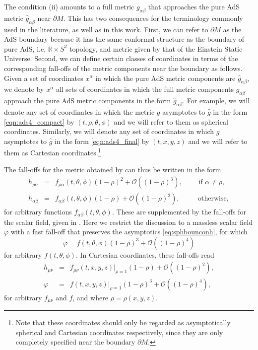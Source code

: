 \documentclass[a4paper,11pt]{article}
\numberwithin{equation}{section}
\begin{document}
The condition (ii) amounts to a full metric $g_{\alpha\beta}$ that approaches the pure AdS metric $\hat{g}_{\alpha\beta}$ near $\partial M$.
This has two consequences for the terminology commonly used in the literature, as well as in this work.
First, we can refer to $\partial M$ as the AdS boundary because it has the same conformal structure as the boundary of pure AdS, i.e, $\mathbb{R}\times S^2$ topology, and metric given by that of the Einstein Static Universe. 
Second, we can define certain classes of coordinates in terms of the corresponding fall-offs of the metric components near the boundary as follows.
Given a set of coordinates $x^\alpha$ in which the pure AdS metric components are $\hat{g}_{\alpha\beta}$, we denote by $x^\alpha$ all sets of coordinates in which the full metric components $g_{\alpha\beta}$ approach the pure AdS metric components in the form $\hat{g}_{\alpha\beta}$. For example, we will denote any set of coordinates in which the metric $g$ asymptotes to $\hat{g}$ in the form \eqref{eqn:ads4_compact} by $(t,\rho,\theta,\phi)$ and we will refer to them as spherical coordinates. Similarly, we will denote any set of coordinates in which $g$ asymptotes to $\hat{g}$ in the form \eqref{eqn:ads4_final} by $(t,x,y,z)$ and we will refer to them as Cartesian coordinates.\footnote{Note that these coordinates should only be regarded as asymptotically spherical and Cartesian coordinates respectively, since they are only completely specified near the boundary $\partial M$.}

The fall-offs for the metric obtained by \cite{Henneaux:1985tv} can thus be written in the form
\begin{eqnarray}
\label{eq:sphbounconh}
h_{\rho\alpha}&=&f_{\rho\alpha}(t,\theta,\phi)(1-\rho)^2+\mathcal{O}((1-\rho)^3), \qquad \textrm{ if $\alpha\neq\rho$}, \\ \nonumber
h_{\alpha\beta}&=&f_{\alpha\beta}(t,\theta,\phi)(1-\rho)+\mathcal{O}((1-\rho)^{2}), \qquad\; \textrm{ otherwise},
\end{eqnarray}
for arbitrary functions $f_{\alpha\beta}(t,\theta,\phi)$. 
These are supplemented by the fall-offs for the scalar field, given in \cite{Henneaux:2006hk}.
Here we restrict the discussion to a massless scalar field $\varphi$ with a fast fall-off that preserves the asymptotics \eqref{eq:sphbounconh}, for which
\begin{equation}\label{eq:sphbounconphi}
\varphi=f(t,\theta,\phi)(1-\rho)^3+\mathcal{O}((1-\rho)^4)
\end{equation}
for arbitrary $f(t,\theta,\phi)$. In Cartesian coordinates, these fall-offs read
\begin{eqnarray}
\label{eq:carbouncondh}
h_{\mu\nu}&=&f_{\mu\nu}(t,x,y,z)|_{\rho=1}(1-\rho)+\mathcal{O}((1-\rho)^{2}), \\
\label{eq:carbouncondphi}
\varphi&=&f(t,x,y,z)|_{\rho=1}(1-\rho)^3+\mathcal{O}((1-\rho)^{4}), 
\end{eqnarray}
for arbitrary $f_{\mu\nu}$ and $f$, and where $\rho = \rho(x,y,z)$.
\end{document}
